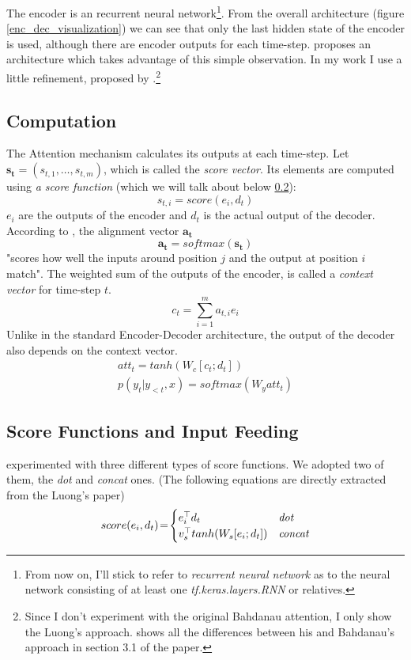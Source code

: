 The encoder is an recurrent neural network\footnote{From now on, I'll stick to refer to \emph{recurrent neural network} as to the neural network consisting of at least one \emph{tf.keras.layers.RNN} or relatives.}. From the overall architecture (figure \ref{enc_dec_visualization}) we can see that only the last hidden state of the encoder is used, although there are encoder outputs for each time-step. \citep{bahdanau2016neural} proposes an architecture which takes advantage of this simple observation. In my work I use a little refinement, proposed by \citep{luong2015effective}.\footnote{Since I don't experiment with the original Bahdanau attention, I only show the Luong's approach. \citep{luong2015effective} shows all the differences between his and Bahdanau's approach in section 3.1 of the paper.}

\subsection{Computation}

The Attention mechanism calculates its outputs at each time-step. Let $\mathbf{s_t} = (s_{t,1},\dots,s_{t,m})$, which is called the \emph{score vector}. Its elements are computed using \emph{a score function} (which we will talk about below \ref{score_input_feeding}):
\begin{equation}
    s_{t,i} = score(e_i, d_t)
\end{equation}
$e_i$ are the outputs of the encoder and $d_t$ is the actual output of the decoder. According to \citep{bahdanau2016neural}, the alignment vector $\mathbf{a_t}$
\begin{equation}
    \mathbf{a_t} = softmax(\mathbf{s_t})
\end{equation}
"scores how well the inputs around position $j$ and the output at position $i$ match". The weighted sum of the outputs of the encoder, is called a \emph{context vector} for time-step $t$.
\begin{equation}
    c_t = \sum_{i=1}^m{a_{t,i}e_i}
\end{equation}
Unlike in the standard Encoder-Decoder architecture, the output of the decoder also depends on the  context vector.
\begin{gather}
    att_t = tanh(W_c[c_t;d_t]) \\
    p(y_t | y_{<t}, x)= softmax(W_y att_t)
\end{gather}

\subsection{Score Functions and Input Feeding} \label{score_input_feeding}
\citep{luong2015effective} experimented with three different types of score functions. We adopted two of them, the \emph{dot} and \emph{concat} ones. (The following equations are directly extracted from the Luong's paper)
\begin{equation*}
score(e_i, d_t)\!=\!\begin{cases}
    e_i^\top d_t & \mbox{{\it dot}}\\
    v_s^\top tanh(W_s[e_i ; d_t]) & \mbox{{\it concat}}
\end{cases}
\end{equation*}

